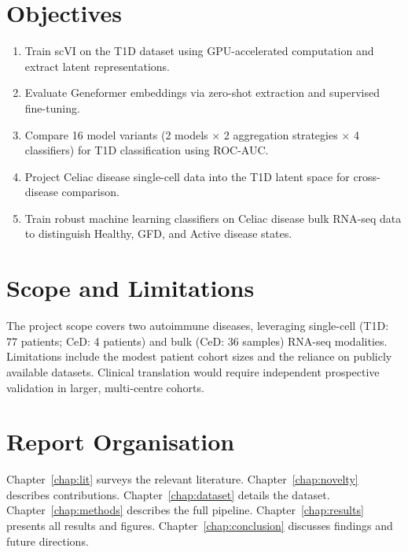 \section{Objectives}

\begin{enumerate}
    \item Train scVI on the T1D dataset using GPU-accelerated computation and extract latent representations.
    \item Evaluate Geneformer embeddings via zero-shot extraction and supervised fine-tuning.
    \item Compare 16 model variants (2 models $\times$ 2 aggregation strategies $\times$ 4 classifiers) for T1D classification using ROC-AUC.
    \item Project Celiac disease single-cell data into the T1D latent space for cross-disease comparison.
    \item Train robust machine learning classifiers on Celiac disease bulk RNA-seq data to distinguish Healthy, GFD, and Active disease states.
\end{enumerate}

\section{Scope and Limitations}

The project scope covers two autoimmune diseases, leveraging single-cell (T1D: 77 patients; CeD: 4 patients) and bulk (CeD: 36 samples) RNA-seq modalities. Limitations include the modest patient cohort sizes and the reliance on publicly available datasets. Clinical translation would require independent prospective validation in larger, multi-centre cohorts.

\section{Report Organisation}

Chapter~\ref{chap:lit} surveys the relevant literature. Chapter~\ref{chap:novelty} describes contributions. Chapter~\ref{chap:dataset} details the dataset. Chapter~\ref{chap:methods} describes the full pipeline. Chapter~\ref{chap:results} presents all results and figures. Chapter~\ref{chap:conclusion} discusses findings and future directions.
